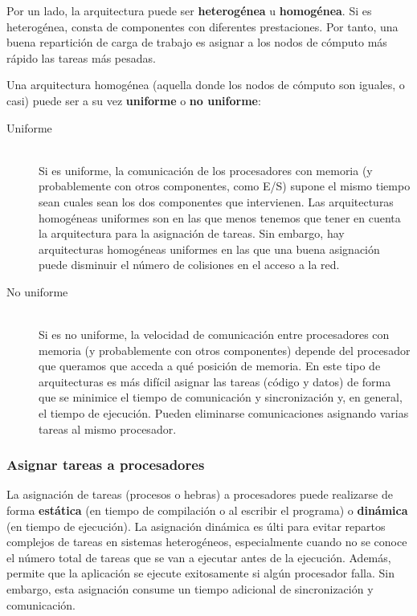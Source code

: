 Por un lado, la arquitectura puede ser \textbf{heterogénea} u \textbf{homogénea}. Si es heterogénea, consta de componentes con diferentes prestaciones. Por tanto, una buena repartición de carga de trabajo es asignar a los nodos de cómputo más rápido las tareas más pesadas. 

Una arquitectura homogénea (aquella donde los nodos de cómputo son iguales, o casi) puede ser a su vez \textbf{uniforme} o \textbf{no uniforme}:
\begin{description}
    \item [Uniforme] ~\\
        Si es uniforme, la comunicación de los procesadores con memoria (y probablemente con otros componentes, como E/S) supone el mismo tiempo sean cuales sean los dos componentes que intervienen. Las arquitecturas homogéneas uniformes son en las que menos tenemos que tener en cuenta la arquitectura para la asignación de tareas. Sin embargo, hay arquitecturas homogéneas uniformes en las que una buena asignación puede disminuir el número de colisiones en el acceso a la red. 
    \item [No uniforme] ~\\
        Si es no uniforme, la velocidad de comunicación entre procesadores con memoria (y probablemente con otros componentes) depende del procesador que queramos que acceda a qué posición de memoria. En este tipo de arquitecturas es más difícil asignar las tareas (código y datos) de forma que se minimice el tiempo de comunicación y sincronización y, en general, el tiempo de ejecución. Pueden eliminarse comunicaciones asignando varias tareas al mismo procesador. 
\end{description}

\subsubsection{Asignar tareas a procesadores}
La asignación de tareas (procesos o hebras) a procesadores puede realizarse de forma \textbf{estática} (en tiempo de compilación o al escribir el programa) o \textbf{dinámica} (en tiempo de ejecución). La asignación dinámica es últi para evitar repartos complejos de tareas en sistemas heterogéneos, especialmente cuando no se conoce el número total de tareas que se van a ejecutar antes de la ejecución. Además, permite que la aplicación se ejecute exitosamente si algún procesador falla. Sin embargo, esta asignación consume un tiempo adicional de sincronización y comunicación.

